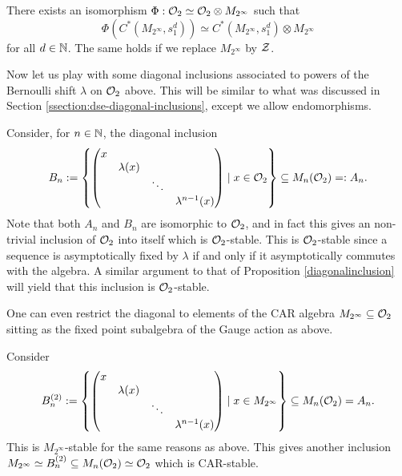 \documentclass[12pt]{amsart}
\begin{document}
      \begin{cor}
        There exists an isomorphism $\Phi: \mathcal{O}_2 \simeq \mathcal{O}_2 \otimes M_{2^{\infty}}$ such that
\begin{equation}
        \Phi(C^*(M_{2^{\infty}},s_1^d)) \simeq C^*(M_{2^{\infty}},s_1^d) \otimes M_{2^{\infty}}
\end{equation}
        for all $d \in \mathbb{N}$. The same holds if we replace $M_{2^{\infty}}$ by $\mathcal{Z}$. 
      \end{cor}


  Now let us play with some diagonal inclusions associated to powers of the Bernoulli shift $\lambda$ on $\mathcal{O}_2$ above.  This will be similar to what was discussed in Section \ref{ssection:dse-diagonal-inclusions}, except we allow endomorphisms.

    \begin{example}
      
  Consider, for $n \in \mathbb{N}$, the diagonal inclusion
\begin{equation}
  B_n:= \left\{   \begin{pmatrix}
      x \\ & \lambda(x) \\ & & \ddots \\ & & & \lambda^{n-1}(x)
  \end{pmatrix} \mid x \in \mathcal{O}_2 \right\} \subseteq M_n(\mathcal{O}_2) =: A_n.
\end{equation}
  Note that both $A_n$ and $B_n$ are isomorphic to $\mathcal{O}_2$, and in fact this gives an non-trivial inclusion of $\mathcal{O}_2$ into itself which is $\mathcal{O}_2$-stable. This is $\mathcal{O}_2$-stable since a sequence is asymptotically fixed by $\lambda$ if and only if it asymptotically commutes with the algebra. A similar argument to that of Proposition \ref{diagonalinclusion} will yield that this inclusion is $\mathcal{O}_2$-stable.
    \end{example}

  One can even restrict the diagonal to elements of the CAR algebra $M_{2^{\infty}} \subseteq \mathcal{O}_2$ sitting as the fixed point subalgebra of the Gauge action as above.
  \begin{example}
  Consider
\begin{equation}
   B_n^{(2)} := \left\{   \begin{pmatrix}
  x \\ & \lambda(x) \\ & & \ddots \\ & & & \lambda^{n-1}(x) \end{pmatrix} \mid x \in M_{2^{\infty}} \right\} \subseteq M_n(\mathcal{O}_2) = A_n.
\end{equation}
  This is $M_{2^{\infty}}$-stable for the same reasons as above. This gives another inclusion $M_{2^{\infty}} \simeq B_n^{(2)} \subseteq M_n(\mathcal{O}_2) \simeq \mathcal{O}_2$ which is CAR-stable.
  \end{example}

  
  
\end{document}
